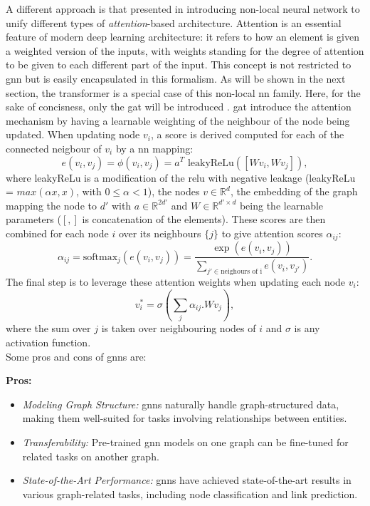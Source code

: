 A different approach is that presented in \cite{nlnnPaper} introducing non-local neural network to unify different types of \textit{attention}-based architecture. Attention is an essential feature of modern deep learning architecture: it refers to how an element is given a weighted version of the inputs, with weights standing for the degree of attention to be given to each different part of the input. This concept is not restricted to \gls{gnn} but is easily encapsulated in this formalism. As will be shown in the next section, the transformer is a special case of this non-local \gls{nn} family. Here, for the sake of concisness, only the \gls{gat} will be introduced \cite{velickovic2018graph}. \gls{gat} introduce the attention mechanism by having a learnable weighting of the neighbour of the node being updated. When updating node $v_i$, a score is derived computed for each of the connected neigbour of $v_i$ by a \gls{nn} mapping: \[e(v_i, v_j) = \phi(v_i, v_j) = a^T \text{ leakyReLu}([W v_i, Wv_j]),\] where leakyReLu is a modification of the \gls{relu} with negative leakage (leakyReLu = $max(\alpha x, x)$, with $0 \leq \alpha < 1$), the nodes $v \in \mathbb{R}^d$, the embedding of the graph mapping the node to $d'$ with  $a \in \mathbb{R}^{2d'}$ and $W \in \mathbb{R}^{d' \times d}$ being the learnable parameters ($[,]$ is concatenation of the elements). These scores are then combined for each node $i$ over its neighbours $\{j\}$ to give attention scores $\alpha_{ij}$: \[ \alpha_{ij} = \text{softmax}_j (e(v_i, v_j)) = \frac{\exp(e(v_i, v_j))}{\sum_{j' \in \text{neighours of i}}e(v_i, v_{j'})}.\] The final step is to leverage these attention weights when updating each node $v_i$: \[v^*_i = \sigma\left(\sum_{j} \alpha_{ij} . W v_j \right),\] where the sum over $j$ is taken over neighbouring nodes of $i$ and $\sigma$ is any activation function.\\
Some pros and cons of \gls{gnn}s are:

\textbf{Pros:}
\begin{itemize}
    \item \textit{Modeling Graph Structure:} \gls{gnn}s naturally handle graph-structured data, making them well-suited for tasks involving relationships between entities.
    \item \textit{Transferability:} Pre-trained \gls{gnn} models on one graph can be fine-tuned for related tasks on another graph.
    \item \textit{State-of-the-Art Performance:} \gls{gnn}s have achieved state-of-the-art results in various graph-related tasks, including node classification and link prediction.
\end{itemize}

